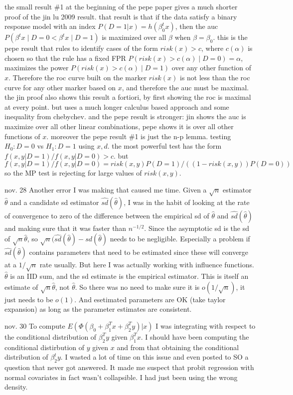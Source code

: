\documentclass{article}
\begin{document}
the small result \#1 at the beginning of the pepe paper gives a much
shorter proof of the jin lu 2009 result. that result is that if the
data satisfy a binary response model with an index
$P(D=1|x)=h(\beta_0^tx)$, then the auc
$P(\beta^t x \mid D=0 < \beta^t x \mid D=1)$ is maximized over all
$\beta$ when $\beta=\beta_0$. this is the pepe result that rules to
identify cases of the form $risk(x)>c$, where $c(\alpha)$ is chosen so
that the rule has a fixed FPR $P(risk(x)>c(\alpha)\mid D=0)=\alpha$,
maximizes the power $P(risk(x)>c(\alpha)\mid D=1)$ over any other
function of $x$. Therefore the roc curve built on the marker $risk(x)$
is not less than the roc curve for any other marker based on $x$, and
therefore the auc must be maximal. the jin proof also shows this
result a fortiori, by first showing the roc is maximal at every
point. but uses a much longer calculus based approach and some
inequality from chebychev. and the pepe result is stronger: jin shows
the auc is maximize over all other linear combinations, pepe shows it
is over all other functions of $x$. moreover the pepe result \#1 is
just the n-p lemma. testing $H_0: D=0$ vs $H_1: D=1$ using $x,d$. the
most powerful test has the form $f(x,y|D=1)/f(x,y|D=0)>c$. but
$f(x,y|D=1)/f(x,y|D=0)=risk(x,y)P(D=1)/((1-risk(x,y))P(D=0))$ so the
MP test is rejecting for large values of $risk(x,y)$.



nov. 28 Another error I was making that caused me time. Given a
$\sqrt{n}$ estimator $\hat\theta$ and a candidate sd estimator
$\hat{sd}(\hat\theta)$, I was in the habit of looking at the rate of
convergence to zero of the difference between the empirical sd of
$\hat\theta$ and $\hat{sd}(\hat\theta)$ and making sure that it was
faster than $n^{-1/2}$. Since the asymptotic sd is the sd of
$\sqrt{n}\hat\theta$, so
$\sqrt{n}(\hat{sd}(\hat\theta)-sd(\hat\theta)$ needs to be
negligible. Especially a problem if $\hat{sd}(\hat\theta)$ contains
parameters that need to be estimated since these will converge at a
$1/\sqrt{n}$ rate usually. But here I was actually working with
influence functions. $\hat\theta$ is an IID sum, and the sd estimate
is the empirical estimator. This is itself an estimate of
$\sqrt{n}\hat\theta$, not $\hat\theta$. So there was no need to make
sure it is $o(1/\sqrt{n})$, it just needs to be $o(1)$. And esetimated
parameters are OK (take taylor expansion) as long as the parameter
estimates are consistent.

nov. 30
To compute $E(\Phi(\beta_0 + \beta_1^Tx + \beta_2^Ty)|x)$ I
was integrating with respect to the conditional distribution of
$\beta_2^Ty$ given $\beta_1^Tx$. I should have been computing the
conditional distirbution of $y$ given $x$ and from that obtaining the
conditional distribution of $\beta_2^ty$. I wasted a lot of time on
this issue and even posted to SO a question that never got
answered. It made me suspect that probit regression with normal
covariates in fact wasn't collapsible. I had just been using the wrong
density.
\end{document}
